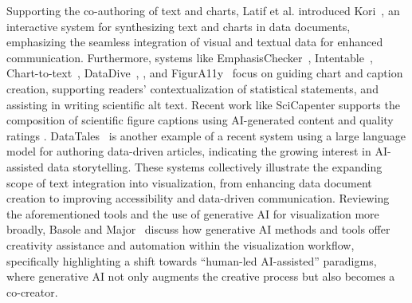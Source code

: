 Supporting the co-authoring of text and charts, Latif et al. introduced Kori~\cite{latif2021kori}, an interactive system for synthesizing text and charts in data documents, emphasizing the seamless integration of visual and textual data for enhanced communication.
Furthermore, systems like EmphasisChecker~\cite{kim2023emphasischecker}, Intentable~\cite{choi2022intentable}, Chart-to-text~\cite{obeid2020chart}, DataDive~\cite{kim2024datadive},
,
and FigurA11y~\cite{singh2024figura11y} focus on guiding chart and caption creation, supporting readers' contextualization of statistical statements, and assisting in writing scientific alt text. Recent work like SciCapenter supports the composition of scientific figure captions using AI-generated content and quality ratings \cite{hsu2024scicapenter}.
DataTales~\cite{sultanum2023datatales} is another example of a recent system using a large language model for authoring data-driven articles, indicating the growing interest in AI-assisted data storytelling.
These systems collectively illustrate the expanding scope of text integration into visualization, from enhancing data document creation to improving accessibility and data-driven communication. Reviewing the aforementioned tools and the use of generative AI for visualization more broadly, Basole and Major~\cite{basole2024generative} discuss how generative AI methods and tools offer creativity assistance and automation within the visualization workflow, specifically highlighting a shift towards ``human-led AI-assisted'' paradigms, where generative AI not only augments the creative process but also becomes a co-creator.

